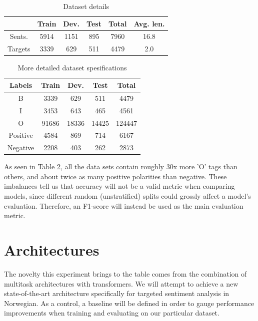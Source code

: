 \documentclass[11pt,a4paper]{article}
\begin{document}
\begin{table}[H]
\centering
\begin{tabular}{|c|c|c|c|c|c|}
\hline
& Train & Dev. & Test & Total & Avg. len.\\
\hline
Sents. & 5914 & 1151 & 895 & 7960 & 16.8\\
Targets & 3339 & 629 & 511 & 4479 & 2.0\\
\hline
\end{tabular}
\caption{Dataset details}
\label{tab:dataStatistics}
\end{table}


\begin{table}[H]
\centering
\begin{tabular}{|c|c|c|c|c|}
\hline
Labels & Train & Dev. & Test & Total\\
\hline

B & 3339 & 629 & 511 & 4479\\
I & 3453 & 643 & 465 & 4561\\
O & 91686 & 18336 & 14425 & 124447\\ 
Positive & 4584 & 869 & 714 & 6167\\
Negative & 2208 & 403 & 262 & 2873\\

\hline
\end{tabular}
\caption{More detailed dataset spesifications}
\label{tab:moreDetailedData}
\end{table}

As seen in Table \ref{tab:moreDetailedData}, all the data sets contain roughly $30$x more 'O' tags than others, and about twice as many positive polarities than negative. These imbalances tell us that accuracy will not be a valid metric when comparing models, since different random  (unstratified) splits could grossly affect a model's evaluation. Therefore, an F1-score will instead be used as the main evaluation metric. 

\section{Architectures}
The novelty this experiment brings to the table comes from the combination of multitask architectures with transformers. We will attempt to achieve a new state-of-the-art architecture specifically for targeted sentiment analysis in Norwegian. As a control, a baseline will be defined in order to gauge performance improvements when training and evaluating on our particular dataset.
\end{document}
